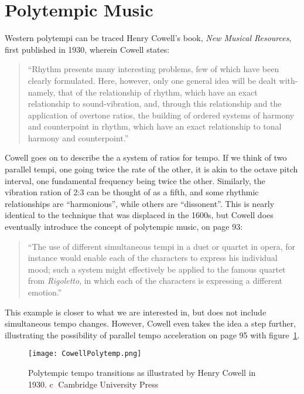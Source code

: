 \section{Polytempic Music}
\label{sec:background-polytempi}
Western polytempi can be traced Henry Cowell's book, \textit{New Musical
  Resources}, first published in 1930, wherein Cowell states:
\begin{quotation}
  ``Rhythm presents many interesting problems, few of which have been
  clearly formulated. Here, however, only one general idea will be
  dealt with-namely, that of the relationship of rhythm, which have an
  exact relationship to sound-vibration, and, through this
  relationship and the application of overtone ratios, the building of
  ordered systems of harmony and counterpoint in rhythm, which have an
  exact relationship to tonal harmony and
  counterpoint.''\cite{Cowell1996}
\end{quotation}
Cowell goes on to describe the a system of ratios for tempo. If we
think of two parallel tempi, one going twice the rate of the other, it
is akin to the octave pitch interval, one fundamental frequency being
twice the other. Similarly, the vibration ration of 2:3 can be thought
of as a fifth, and some rhythmic relationships are ``harmonious'',
while others are ``dissonent''. This is nearly identical to the
technique that was displaced in the 1600s, but Cowell does eventually
introduce the concept of polytempic music, on page 93:
\begin{quotation}
``The use of different simultaneous tempi in a duet or quartet in opera,
for instance would enable each of the characters  to express his
individual mood; such a system might  effectively be applied to the
famous quartet from \textit{Rigoletto}, in which each of the
characters is expressing a different emotion.''
\end{quotation}
This example is closer to what we are interested in, but does not
include simultaneous tempo changes. However, Cowell even takes the
idea a step further, illustrating the possibility of parallel tempo
acceleration on page 95 with figure~\ref{fig:cowell-polytemp}.
\begin{figure}[h]
  \texttt{[image: CowellPolytemp.png]}
  \caption{Polytempic tempo transitions as illustrated by Henry Cowell
    in 1930. \textcircled{c} Cambridge University Press}
  \label{fig:cowell-polytemp}
\end{figure}
